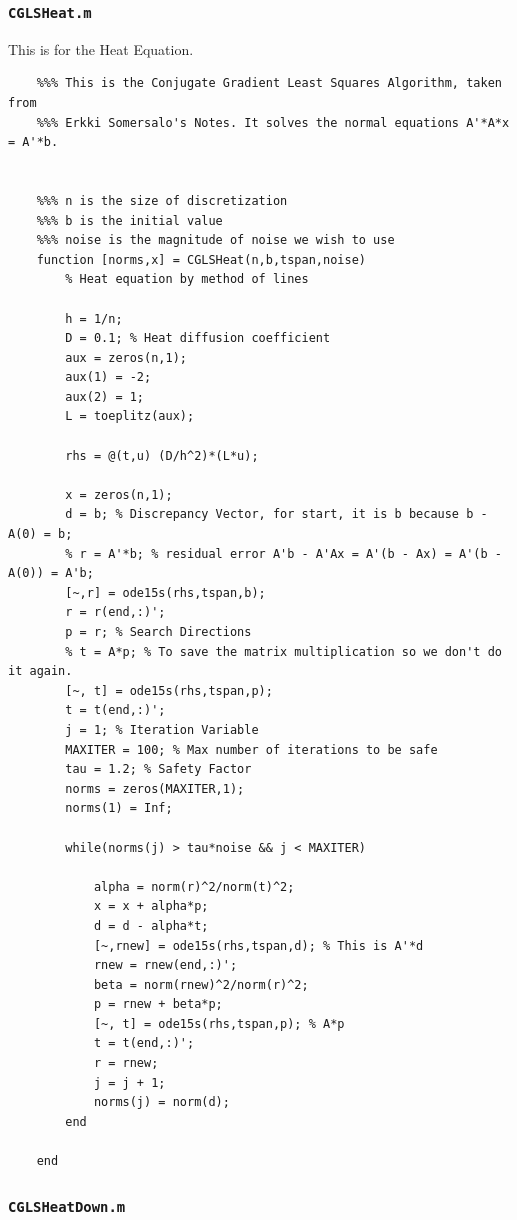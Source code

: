 \documentclass{article}
\begin{document}
\subsubsection{\texttt{CGLSHeat.m}}
This is for the Heat Equation.
\begin{verbatim}
    %%% This is the Conjugate Gradient Least Squares Algorithm, taken from
    %%% Erkki Somersalo's Notes. It solves the normal equations A'*A*x = A'*b.


    %%% n is the size of discretization
    %%% b is the initial value
    %%% noise is the magnitude of noise we wish to use
    function [norms,x] = CGLSHeat(n,b,tspan,noise)
        % Heat equation by method of lines

        h = 1/n;
        D = 0.1; % Heat diffusion coefficient
        aux = zeros(n,1);
        aux(1) = -2;
        aux(2) = 1;
        L = toeplitz(aux);

        rhs = @(t,u) (D/h^2)*(L*u);

        x = zeros(n,1);
        d = b; % Discrepancy Vector, for start, it is b because b - A(0) = b;
        % r = A'*b; % residual error A'b - A'Ax = A'(b - Ax) = A'(b - A(0)) = A'b;
        [~,r] = ode15s(rhs,tspan,b);
        r = r(end,:)';
        p = r; % Search Directions
        % t = A*p; % To save the matrix multiplication so we don't do it again.
        [~, t] = ode15s(rhs,tspan,p);
        t = t(end,:)';
        j = 1; % Iteration Variable
        MAXITER = 100; % Max number of iterations to be safe
        tau = 1.2; % Safety Factor
        norms = zeros(MAXITER,1);
        norms(1) = Inf;

        while(norms(j) > tau*noise && j < MAXITER)

            alpha = norm(r)^2/norm(t)^2;
            x = x + alpha*p;
            d = d - alpha*t;
            [~,rnew] = ode15s(rhs,tspan,d); % This is A'*d
            rnew = rnew(end,:)';
            beta = norm(rnew)^2/norm(r)^2;
            p = rnew + beta*p;
            [~, t] = ode15s(rhs,tspan,p); % A*p
            t = t(end,:)';
            r = rnew;
            j = j + 1;
            norms(j) = norm(d);
        end

    end
\end{verbatim}

\subsubsection{\texttt{CGLSHeatDown.m}}
\end{document}
